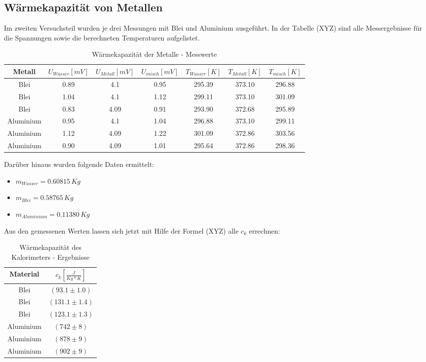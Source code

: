 \documentclass[11pt,ngerman,a4paper]{article}
\begin{document}
\subsection{Wärmekapazität von Metallen}
Im zweiten Versuchsteil wurden je drei Messungen mit Blei und Aluminium ausgeführt. In der Tabelle (XYZ) sind alle Messergebnisse für die Spannungen sowie die berechneten Temperaturen aufgelistet.
\begin{table}[H]
\centering
\begin{tabular}{|c|c|c|c|c|c|c|}
\hline
Metall & $U_{Wasser}[mV]$ &$U_{Metall}[mV]$ &$U_{misch}[mV]$ & $T_{Wasser}[K]$ & $T_{Metall}[K]$ & $T_{misch}[K]$ \\
\hline
Blei & 0.89 & 4.1 & 0.95 & 295.39 & 373.10 & 296.88\\
Blei & 1.04 & 4.1 & 1.12 & 299.11 & 373.10 & 301.09\\
Blei & 0.83 & 4.09 & 0.91 & 293.90 & 372.68 & 295.89\\
Aluminium & 0.95 & 4.1 & 1.04 & 296.88 & 373.10 & 299.11\\
Aluminium & 1.12 & 4.09 & 1.22 & 301.09 & 372.86 & 303.56\\
Aluminium & 0.90 & 4.09 & 1.01 & 295.64 & 372.86 & 298.36\\
\hline
\end{tabular}
\caption{Wärmekapazität der Metalle - Messwerte}
\end{table}
\noindent
Darüber hinaus wurden folgende Daten ermittelt:
\begin{itemize}
\item $m_{Wasser} = 0.60815 \,Kg$
\item $m_{Blei} = 0.58765 \, Kg$
\item $m_{Aluminium} = 0.11380 \, Kg$
\end{itemize}
Aus den gemessenen Werten lassen sich jetzt mit Hilfe der Formel (XYZ) alle $c_k$ errechnen:
\begin{table}[H]
\centering
\begin{tabular}{|c|c|}
\hline
Material & $c_k [\frac{J}{Kg*K}]$ \\
\hline
Blei & $(93.1 \pm 1.0)$ \\
Blei & $(131.1\pm1.4)$ \\
Blei & $(123.1\pm1.3)$\\
Aluminium & $(742\pm8)$ \\
Aluminium & $(878\pm9)$\\
Aluminium & $(902\pm9)$\\
\hline
\end{tabular}
\caption{Wärmekapazität des Kalorimeters - Ergebnisse}
\end{table}
\end{document}
